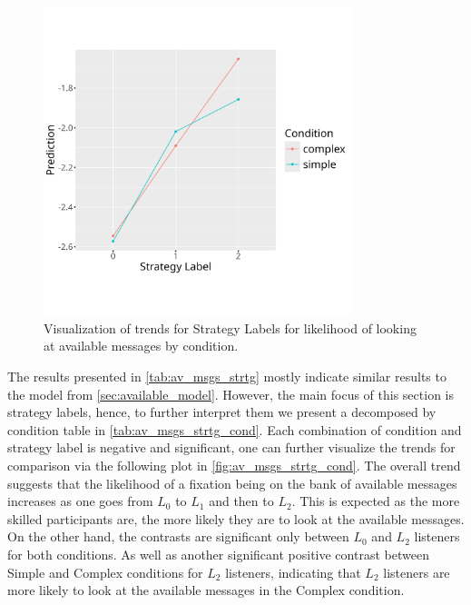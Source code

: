 \begin{figure}
    \centering
    \includegraphics[width=0.8\textwidth]{images/av_msgs_strategy_labels_plot.png}
    \caption{Visualization of trends for Strategy Labels for likelihood of looking at available messages by condition.}
    \label{fig:av_msgs_strtg_cond}
\end{figure}



The results presented in \autoref{tab:av_msgs_strtg} mostly indicate similar results to the model from \autoref{sec:available_model}. However, the main focus of this section is strategy labels, hence, to further interpret them we present a decomposed by condition table in \autoref{tab:av_msgs_strtg_cond}. Each combination of condition and strategy label is negative and significant, one can further visualize the trends for comparison via the following plot in \autoref{fig:av_msgs_strtg_cond}. The overall trend suggests that the likelihood of a fixation being on the bank of available messages increases as one goes from $L_0$ to $L_1$ and then to $L_2$. This is expected as the more skilled participants are, the more likely they are to look at the available messages. On the other hand, the contrasts are significant only between $L_0$ and $L_2$ listeners for both conditions. As well as another significant positive contrast between Simple and Complex conditions for $L_2$ listeners, indicating that $L_2$ listeners are more likely to look at the available messages in the Complex condition.













